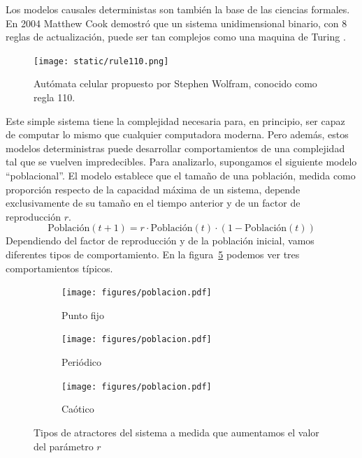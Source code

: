 \documentclass[a4paper,10pt]{book}
\begin{document}

Los modelos causales deterministas son también la base de las ciencias formales.
%
En 2004 Matthew Cook demostró que un sistema unidimensional binario, con 8 reglas de actualización, puede ser tan complejos como una maquina de Turing \cite{cook2004-automata}.
%
\begin{figure}[ht!]
    \centering
    \texttt{[image: static/rule110.png]}
    \caption{Autómata celular propuesto por Stephen Wolfram, conocido como regla 110.}
    \label{fig:rule110}
\end{figure}
%
Este simple sistema tiene la complejidad necesaria para, en principio, ser capaz de computar lo mismo que cualquier computadora moderna.
%
Pero además, estos modelos deterministras puede desarrollar comportamientos de una complejidad tal que se vuelven impredecibles.
%
Para analizarlo, supongamos el siguiente modelo ``poblacional''.
%
El modelo establece que el tamaño de una población, medida como proporción respecto de la capacidad máxima de un sistema, depende exclusivamente de su tamaño en el tiempo anterior y de un factor de reproducción $r$. 
%
\begin{equation}
 \text{Población}(t+1) = r \cdot \text{Población}(t)\cdot (1-\text{Población}(t))
\end{equation}
%     
%     
% 
%
Dependiendo del factor de reproducción y de la población inicial, vamos diferentes tipos de comportamiento.
%
En la figura~\ref{fig:poblacion} podemos ver tres comportamientos típicos.
%
\begin{figure}[ht!]
    \centering
    \begin{subfigure}[b]{0.32\textwidth}
    \texttt{[image: figures/poblacion.pdf]}
    \caption{Punto fijo}
    \label{fig:poblacion_punto_fijo}
    \end{subfigure}
    \begin{subfigure}[b]{0.32\textwidth}
    \texttt{[image: figures/poblacion.pdf]}
    \caption{Periódico}
    \label{fig:poblacion_periodico}
    \end{subfigure}
    \begin{subfigure}[b]{0.32\textwidth}
    \texttt{[image: figures/poblacion.pdf]}
    \caption{Caótico}
    \label{fig:poblacion_caotico}
    \end{subfigure}
    \caption{
    Tipos de atractores del sistema a medida que aumentamos el valor del parámetro $r$
    }
    \label{fig:poblacion}
\end{figure}
\end{document}
